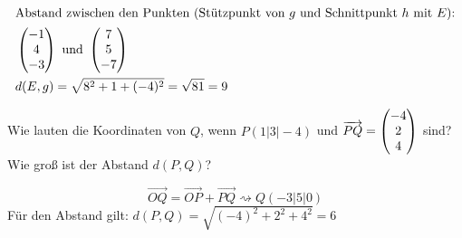 \begin{lsg}{}
\begin{enumerate}
\begin{align*}
			\intertext{Abstand zwischen den Punkten (Stützpunkt von $g$ und Schnittpunkt $h$ mit $E$):}
			&\begin{pmatrix} -1 \\ 4 \\ -3 \end{pmatrix} \text{ und } \begin{pmatrix} 7\\5\\-7 \end{pmatrix} \\
			&d(E,g)=\sqrt{8^2+1+(-4)^2}=\sqrt{81}=9
		\end{align*}
	\end{enumerate}
\end{lsg}


Wie lauten die Koordinaten von $Q$, wenn $P(1|3|-4)$ und $\overrightarrow{PQ}=\begin{pmatrix} -4\\2\\4 \end{pmatrix}$ sind? Wie groß ist der Abstand $d(P,Q)$?

\begin{lsg}{}
	\begin{equation*}
			\overrightarrow{OQ}=\overrightarrow{OP}+\overrightarrow{PQ}\rightsquigarrow Q(-3|5|0)
	\end{equation*}
	Für den Abstand gilt: $d(P,Q)=\sqrt{(-4)^2+2^2+4^2}=6$
\end{lsg}



